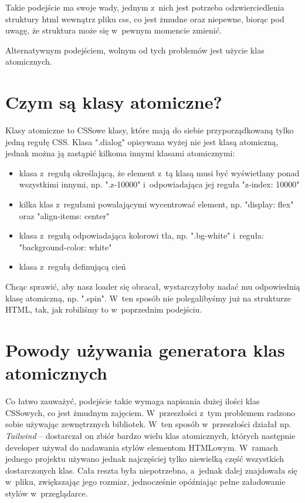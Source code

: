 \documentclass{SGGW-thesis}
\begin{document}
Takie podejście ma swoje wady, jednym z~nich jest potrzeba odzwierciedlenia struktury html wewnątrz pliku css, co jest żmudne oraz niepewne, biorąc pod uwagę, że struktura może się w~pewnym momencie zmienić.

Alternatywnym podejściem, wolnym od tych problemów jest użycie klas atomicznych\cite{css_master}.


\section{Czym są klasy atomiczne?}
Klasy atomiczne to CSSowe klasy, które mają do siebie przyporządkowaną tylko jedną regułę CSS. Klasa ".dialog" opisywana wyżej nie jest klasą atomiczną, jednak można ją zastąpić kilkoma innymi klasami atomicznymi:
\begin{itemize}
    \item klasa z~regułą określającą, że element z~tą klasą musi być wyświetlany ponad wszystkimi innymi, np. ".z-10000" i~odpowiadająca jej reguła "z-index: 10000"
    \item kilka klas z~regułami powalającymi wycentrować element, np. "display: flex" oraz "align-items: center"
    \item klasa z~regułą odpowiadająca kolorowi tła, np. ".bg-white" i~reguła: "background-color: white"
    \item klasa z~regułą definującą cień
\end{itemize}

Chcąc sprawić, aby nasz loader się obracał, wystarczyłoby nadać mu odpowiednią klasę atomiczną, np. ".spin". W~ten sposób nie polegalibyśmy już na strukturze HTML, tak, jak robiliśmy to w~poprzednim podejściu.


\section{Powody używania generatora klas atomicznych}
Co łatwo zauważyć, podejście takie wymaga napisania dużej ilości klas CSSowych, co jest żmudnym zajęciem. W~przeszłości z~tym problemem radzono sobie używając zewnętrznych bibliotek. W~ten sposób w~przeszłości działał np. \emph{Tailwind} -- dostarczał on zbiór bardzo wielu klas atomicznych, których następnie developer używał do nadawania stylów elementom HTMLowym. W~ramach jednego projektu używano jednak najczęściej tylko niewielką część wszystkich dostarczonych klas. Cała reszta była niepotrzebna, a~jednak dalej znajdowała się w~pliku, zwiększając jego rozmiar, jednocześnie opóźniając pełne załadowanie stylów w~przeglądarce.
\end{document}
